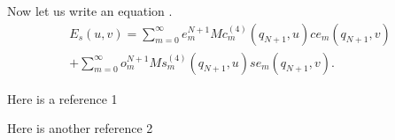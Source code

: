 \documentclass[11pt]{article}
\begin{document}
\begin{multicols}{2}
Now let us write an equation \cite{label2}.
\begin{align*}
E_s(u,v)=\sum_{m=0}^{\infty}e_m^{N+1}Mc_m^{(4)}(q_{N+1},u)ce_m(q_{N+1},v)  \\ + \sum_{m=0}^{\infty}o_m^{N+1}Ms_m^{(4)}(q_{N+1},u)se_m(q_{N+1},v).
\end{align*}


\begin{thebibliography}{9}
	{\footnotesize
	 Here is a reference 1
	
	 Here is another reference 2
	}
\end{thebibliography}

\end{multicols}%

\end{document}
